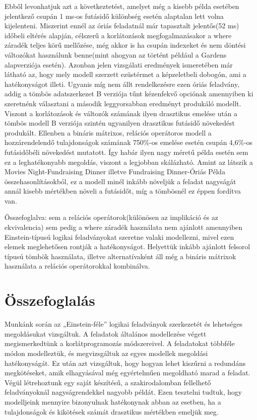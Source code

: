 \documentclass[12pt,a4paper]{report}
\begin{document}
    Ebből levonhatjuk azt a következtetést, amelyet még a kisebb példa esetében jelentkező csupán 1 ms-os futásidő különbség esetén alaptalan lett volna kijelenteni.
    Miszerint ennél az óriás feladatnál már tapasztalt jelentős(52 ms) időbeli eltérés alapján, célszerű a korlátozások megfogalmazásakor a where záradék teljes körű mellőzése, még akkor is ha csupán indexeket és nem döntési változókat használunk benne(mint ahogyan az történt például a Gardens alapverziója esetén).
    Azonban jelen vizsgálati eredmények ismeretében már látható az, hogy mely modell szerzett ezüstérmet a képzeletbeli dobogón, ami a hatékonyságot illeti.
    Ugyanis míg nem állt rendelkezésre ezen óriás feladvány, addig a tömbös adatszerkezet B verziója tűnt kézenfekvő opciónak amennyiben ki szeretnénk választani a második leggyorsabban eredményt produkáló modellt.
    Viszont a korlátozások és változók számának ilyen drasztikus emelése után a tömbös modell B verziója szintén ugyanilyen drasztikus futásidő növekedést produkált.
    Ellenben a bináris mátrixos, relációs operátoros modell a hozzárendelendő tulajdonságok számának 750\%-os emelése esetén csupán 4,6\%-os futásidőbéli növekedést mutatott.
    Így habár ilyen nagy méretű példa esetén sem ez a leghatékonyabb megoldás, viszont a legjobban skálázható.
    Amint az látszik a Movies Night-Fundraising Dinner illetve Fundraising Dinner-Óriás Példa összehasonlításokból, ez a modell minél inkább növeljük a feladat nagyságát annál kisebb mértékben növeli a futásidőt, míg a tömbösnél ez éppen fordítva van.
    
    Összefoglalva: sem a relációs operátorok(különösen az implikáció és az ekvivalencia) sem pedig a where záradék használata nem ajánlott amennyiben Einstein-típusú logikai feladványokat szeretne valaki modellezni, mivel ezen elemek meglehetősen rontják a hatékonyságot.
    Helyettük inkább ajánlott felsorol típusú tömbök használata, illetve alternatívaként áll még a bináris mátrixok használata a relációs operátorokkal kombinálva.


\chapter{Összefoglalás}

    Munkánk során az „Einstein-féle” logikai feladványok szerkezetét és lehetséges megoldásukat vizsgáltuk.
    A feladatok általános modellezése végett megismerkedtünk a korlátprogramozás módszereivel.
    A feladatokat többféle módon modelleztük, és megvizsgáltuk az egyes modellek megoldási hatékonyságát.
    Ez után azt vizsgáltuk, hogy hogyan lehet kiszűrni a redundáns megkötéseket, amik elhagyásával még egyértelműen megoldható marad a feladat.
    Végül létrehoztunk egy saját készítésű, a szakirodalomban fellelhető feladványoknál nagyságrendekkel nagyobb példát.
    Ezen tesztelni tudtuk, hogy modelljeink mennyire bizonyulnak hatékonynak abban az esetben, ha a tulajdonságok és kikötések számát drasztikus mértékben emeljük meg.




\end{document}
